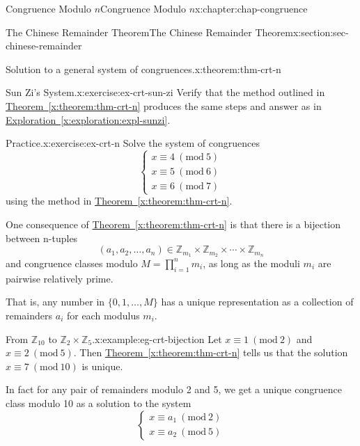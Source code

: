 \documentclass[oneside,10pt,]{book}
\newcommand{\xreffont}{\relax}
\numberwithin{equation}{section}
\newcommand{\Mod}[1]{\ \left(\mathrm{mod}\ #1\right)}
\begin{document}
\begin{chapterptx}{Congruence Modulo \(n\)}{}{Congruence Modulo \(n\)}{}{}{x:chapter:chap-congruence}
\begin{sectionptx}{The Chinese Remainder Theorem}{}{The Chinese Remainder Theorem}{}{}{x:section:sec-chinese-remainder}
\begin{theorem}{Solution to a general system of congruences.}{}{x:theorem:thm-crt-n}
\end{theorem}
\begin{inlineexercise}{Sun Zi's System.}{x:exercise:ex-crt-sun-zi}%
Verify that the method outlined in \hyperref[x:theorem:thm-crt-n]{Theorem~{\xreffont\ref{x:theorem:thm-crt-n}}} produces the same steps and answer as in \hyperref[x:exploration:expl-sunzi]{Exploration~{\xreffont\ref{x:exploration:expl-sunzi}}}.%
\end{inlineexercise}
\begin{inlineexercise}{Practice.}{x:exercise:ex-crt-n}%
Solve the system of congruences%
\begin{equation*}
\begin{cases} x \equiv 4 \Mod{5} \\ x \equiv 5 \Mod{6} \\ x \equiv 6 \Mod{7} \end{cases}
\end{equation*}
using the method in \hyperref[x:theorem:thm-crt-n]{Theorem~{\xreffont\ref{x:theorem:thm-crt-n}}}.%
\end{inlineexercise}
One consequence of \hyperref[x:theorem:thm-crt-n]{Theorem~{\xreffont\ref{x:theorem:thm-crt-n}}} is that there is a bijection between n-tuples%
\begin{equation*}
(a_1,a_2,\ldots,a_n) \in \mathbb{Z}_{m_1} \times \mathbb{Z}_{m_2} \times \cdots \times \mathbb{Z}_{m_n}
\end{equation*}
and congruence classes modulo \(M = \prod_{i=1}^n m_i\), as long as the moduli \(m_i\) are pairwise relatively prime.%
\par
That is, any number in \(\{0,1,\ldots,M\}\) has a unique representation as a collection of remainders \(a_i\) for each modulus \(m_i\).%
\begin{example}{From \(\mathbb{Z}_{10}\) to \(\mathbb{Z}_2 \times \mathbb{Z}_5\).}{x:example:eg-crt-bijection}%
Let \(x \equiv 1 \Mod{2}\) and \(x \equiv 2 \Mod{5}\). Then \hyperref[x:theorem:thm-crt-n]{Theorem~{\xreffont\ref{x:theorem:thm-crt-n}}} tells us that the solution \(x \equiv 7 \Mod{10}\) is unique.%
\par
In fact for any pair of remainders modulo 2 and 5, we get a unique congruence class modulo 10 as a solution to the system%
\begin{equation*}
\begin{cases} x \equiv a_1 \Mod{2} \\ x \equiv a_2 \Mod{5}\end{cases}
\end{equation*}

\end{example}
\end{sectionptx}
\end{chapterptx}
\end{document}
